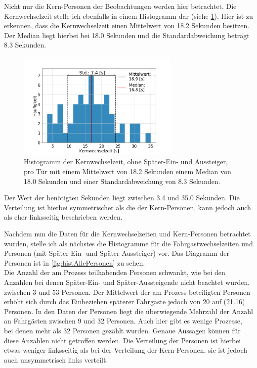 Nicht nur die Kern-Personen der Beobachtungen werden hier betrachtet. Die Kernwechselzeit stelle ich ebenfalls in einem Histogramm dar (siehe \figurename \ref{fig:histTimes}). Hier ist zu erkennen, dass die Kernwechselzeit einen Mittelwert von 18.2 Sekunden besitzen. Der Median liegt hierbei bei 18.0 Sekunden und die Standardabweichung beträgt 8.3 Sekunden. 
\begin{figure}[H]
	\centering
		\includegraphics[width=0.7\textwidth]{pictures/data_evaluation/transferTime/hist_core_transfer_time.png}
	\caption{Histogramm der Kernwechselzeit, ohne Später-Ein- und Aussteiger, pro Tür mit einem Mittelwert von 18.2 Sekunden einem Median von 18.0 Sekunden und einer Standardabweichung von 8.3 Sekunden.}
	\label{fig:histTimes}
\end{figure}
Der Wert der benötigten Sekunden liegt zwischen 3.4 und 35.0 Sekunden. Die Verteilung ist hierbei symmetrischer als die der Kern-Personen, kann jedoch auch als eher linksseitig beschrieben werden.

Nachdem nun die Daten für die Kernwechselzeiten und Kern-Personen betrachtet wurden, stelle ich als nächstes die Histogramme für die Fahrgastwechselzeiten und Personen (mit Später-Ein- und Später-Aussteiger) vor. Das Diagramm der Personen ist in \figurename \ref{fig:histAllePersonen} zu sehen. \\
Die Anzahl der am Prozess teilhabenden Personen schwankt, wie bei den Anzahlen bei denen Später-Ein- und Später-Aussteigende nicht beachtet wurden, zwischen 3 und 53 Personen. Der Mittelwert der am Prozess beteiligten Personen erhöht sich durch das Einbeziehen späterer Fahrgäste jedoch von 20 auf  (21.16) Personen. In den Daten der Personen liegt die überwiegende Mehrzahl der Anzahl an Fahrgästen zwischen 9 und 32 Personen. Auch hier gibt es wenige Prozesse, bei denen mehr als 32 Personen gezählt wurden. Genaue Aussagen können für diese Anzahlen nicht getroffen werden. Die Verteilung der Personen ist hierbei etwas weniger linksseitig als bei der Verteilung der Kern-Personen, sie ist jedoch auch unsymmetrisch links verteilt.

